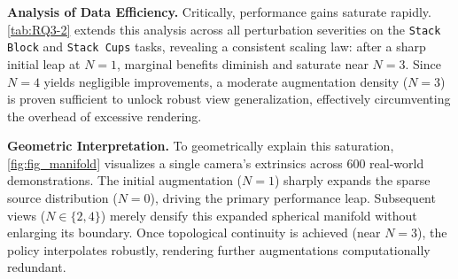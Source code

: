 \noindent \textbf{Analysis of Data Efficiency.}
Critically, performance gains saturate rapidly. \cref{tab:RQ3-2} extends this analysis across all perturbation severities on the \texttt{Stack Block} and \texttt{Stack Cups} tasks, revealing a consistent scaling law: after a sharp initial leap at $N=1$, marginal benefits diminish and saturate near $N=3$. Since $N=4$ yields negligible improvements, a moderate augmentation density ($N=3$) is proven sufficient to unlock robust view generalization, effectively circumventing the overhead of excessive rendering.

\noindent \textbf{Geometric Interpretation.}
To geometrically explain this saturation, \cref{fig:fig_manifold} visualizes a single camera's extrinsics across 600 real-world demonstrations. The initial augmentation ($N=1$) sharply expands the sparse source distribution ($N=0$), driving the primary performance leap. Subsequent views ($N \in \{2, 4\}$) merely densify this expanded spherical manifold without enlarging its boundary. Once topological continuity is achieved (near $N=3$), the policy interpolates robustly, rendering further augmentations computationally redundant.

